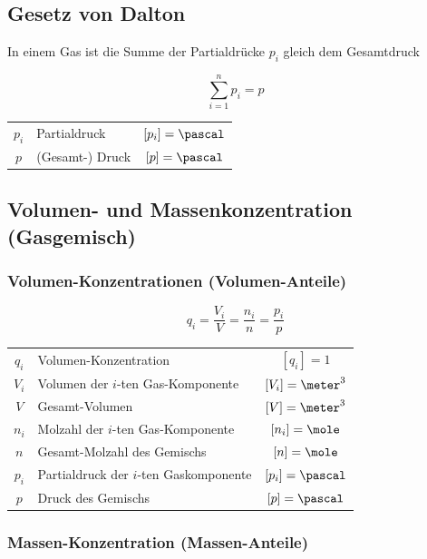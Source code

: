 \subsection{Gesetz von Dalton}

In einem Gas ist die Summe der Partialdrücke $p_i$ gleich dem Gesamtdruck 

\begin{minipage}[c]{0.38\columnwidth}
	$$ \boxed{ \sum_{i=1}^n  p_i = p } $$
\end{minipage}
\hfill
\begin{minipage}[c]{0.58\columnwidth}
	\begin{tabular}{c l c}
		$p_i$	& Partialdruck 		& $[p_i] = \pascal$	\\
		$p$ 	& (Gesamt-) Druck 	& $[p] = \pascal$ 	
	\end{tabular}
\end{minipage}
 


\subsection{Volumen- und Massenkonzentration (Gasgemisch)}

\subsubsection{Volumen-Konzentrationen (Volumen-Anteile)}

\vspace{-0.2cm}

$$ \boxed{  q_i = \frac{V_i}{V} = \frac{n_i}{n} = \frac{p_i}{p} } $$


\begin{tabular}{c l c}
	$q_i$ 	& Volumen-Konzentration						& $[q_i] = 1$ 			\\
	$V_i$ 	& Volumen der $i$-ten Gas-Komponente 		& $[V_i] = \meter^3$ 	\\
	$V$ 	& Gesamt-Volumen	 						& $[V] = \meter^3$ 		\\
	$n_i$ 	& Molzahl der $i$-ten Gas-Komponente 		& $[n_i] = \mole$ 		\\
	$n$ 	& Gesamt-Molzahl des Gemischs 				& $[n] = \mole$ 		\\
	$p_i$ 	& Partialdruck der $i$-ten Gaskomponente 	& $[p_i] = \pascal$ 	\\
	$p$ 	& Druck des Gemischs 						& $[p] = \pascal$
\end{tabular}


\subsubsection{Massen-Konzentration (Massen-Anteile)}

